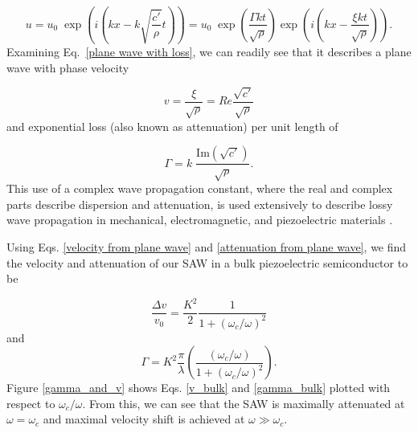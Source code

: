 \documentclass[double,12pt,1in,seploa]{beavtex}
\begin{document}
\begin{equation}
    u = u_0 \; \exp\left(i(kx-k\sqrt{\frac{c'}{\rho}}t)\right)
    = u_0 \; \exp\left(\frac{\Gamma k t}{\sqrt{\rho}}\right) \exp\left(i(kx - \frac{\xi kt}{\sqrt{\rho}})\right). \label{plane wave with loss}
\end{equation}
Examining Eq.\ \ref{plane wave with loss}, we can readily see that it describes a plane wave with phase velocity 

\begin{equation}
    v = \frac{\xi}{\sqrt{\rho}} = Re{\frac{\sqrt{c'}}{\sqrt{\rho}}} \label{velocity from plane wave}
\end{equation} 
and exponential loss (also known as attenuation) per unit length of 

\begin{equation}
    \Gamma = k \; \frac{\mathrm{Im}(\sqrt{c'})}{\sqrt{\rho}}. \label{attenuation from plane wave}
\end{equation} 
This use of a complex wave propagation constant, where the real and complex parts describe dispersion and attenuation, is used extensively to describe lossy wave propagation in mechanical, electromagnetic, and piezoelectric materials \cite{holland_representation_1967} \cite[p.\ 18]{pozar_microwave_2012} \cite{weinreich_acoustodynamic_1956, gonzalez_revisiting_2016}. 

Using Eqs. \ref{velocity from plane wave} and \ref{attenuation from plane wave}, we find the velocity and attenuation of our SAW in a bulk piezoelectric semiconductor to be

\begin{equation}
    \frac{\Delta v}{v_0} = \frac{K^2}{2}\frac{1}{1+(\omega_c/\omega)^2} \label{v_bulk}
\end{equation}
and
\begin{equation}
    \Gamma = K^2 \frac{\pi}{\lambda}\left(\frac{(\omega_c/\omega)}{1+(\omega_c/\omega)^2}\right). \label{gamma_bulk}
\end{equation}
Figure \ref{gamma_and_v} shows Eqs. \ref{v_bulk} and \ref{gamma_bulk} plotted with respect to  $\omega_c/\omega$. From this, we can see that the SAW is maximally attenuated at $\omega = \omega_c$ and maximal velocity shift is achieved at $\omega \gg \omega_c$.
\end{document}
